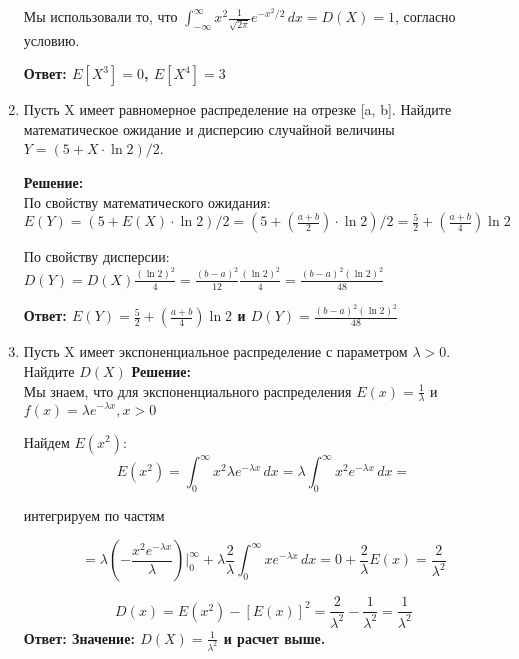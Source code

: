 \documentclass[a4paper,12pt]{article}
\begin{document}
\begin{enumerate}
Мы использовали то, что $\int_{-\infty}^{\infty}  x^2 \frac{1}{\sqrt{2 \pi}} e^{-x^2 /2  }\,dx=D(X)=1$, согласно условию.

\textbf{Ответ: $E[X^3]=0$, $E[X^4]=3$} 

\item Пусть X имеет равномерное распределение на отрезке [a, b]. Найдите математическое ожидание и дисперсию случайной величины $Y = (5 + X \cdot \ln{2})/2$.

\textbf{Решение:}\\
По свойству математического ожидания: $E(Y)=(5 + E(X) \cdot \ln{2})/2=(5 + (\frac{a+b}{2}) \cdot \ln{2})/2=\frac{5}{2}+(\frac{a+b}{4})  \ln{2}$

По свойству дисперсии: $D(Y)= D(X)\frac{(\ln{2})^2}{4}=\frac{(b-a)^2}{12}\frac{(\ln{2})^2}{4}=\frac{(b-a)^2(\ln{2})^2}{48}$


\textbf{Ответ: $E(Y) = \frac{5}{2}+(\frac{a+b}{4})  \ln{2}$ и $D(Y)=\frac{(b-a)^2(\ln{2})^2}{48}$ } 


\item Пусть X имеет экспоненциальное распределение с параметром $\lambda > 0$. Найдите $D(X)$
\textbf{Решение:}\\
Мы знаем, что для экспоненциального распределения $E(x) = \frac{1}{\lambda}$ и $f(x) = \lambda e^{-\lambda x}, x> 0$

Найдем $E(x^2)$:
$$E(x^2)=\int_{0}^{\infty} x^2 \lambda e^{-\lambda x}\,dx=\lambda \int_{0}^{\infty} x^2  e^{-\lambda x}\,dx=$$

интегрируем по частям

$$=\lambda (-\frac{x^2 e^{-\lambda x}}{\lambda}) \Big|_0^\infty+\lambda \frac{2}{\lambda} \int_{0}^{\infty} x  e^{-\lambda x}\,dx=0+\frac{2}{\lambda}E(x) = \frac{2}{\lambda^2}$$

$$D(x) = E(x^2)-[E(x)]^2 = \frac{2}{\lambda^2}-\frac{1}{\lambda^2}=\frac{1}{\lambda^2}$$
\textbf{Ответ: Значение: $D(X)=\frac{1}{\lambda^2}$ и расчет выше.} 

\end{enumerate}
\end{document}
